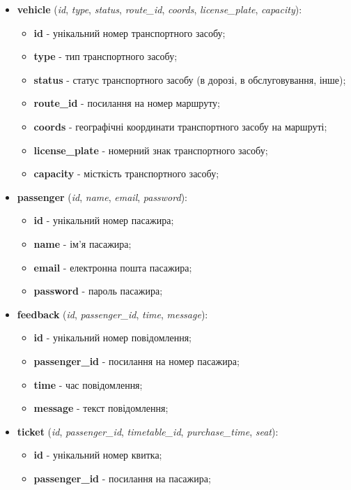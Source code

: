 \documentclass[14pt]{extreport}
\begin{document}
\begin{normalsize}
\begin{itemize}
		\item \textbf{vehicle} (\textit{id}, \textit{type}, \textit{status}, \textit{route\_id}, \textit{coords}, \textit{license\_plate}, \textit{capacity}):
		\begin{itemize}
			\item \textbf{id} - унікальний номер транспортного засобу;
			\item \textbf{type} - тип транспортного засобу; 
			\item \textbf{status} - статус транспортного засобу (в дорозі, в обслуговування, інше);
			\item \textbf{route\_id} - посилання на номер маршруту;
			\item \textbf{coords} - географічні координати транспортного засобу на маршруті;
			\item \textbf{license\_plate} - номерний знак транспортного засобу;
			\item \textbf{capacity} - місткість транспортного засобу;
		\end{itemize}
		\item \textbf{passenger} (\textit{id}, \textit{name}, \textit{email}, \textit{password}):
		\begin{itemize}
			\item \textbf{id} - унікальний номер пасажира;
			\item \textbf{name} - ім'я пасажира;
			\item \textbf{email} - електронна пошта пасажира;
			\item \textbf{password} - пароль пасажира;
		\end{itemize}
		\item \textbf{feedback} (\textit{id}, \textit{passenger\_id}, \textit{time}, \textit{message}):
		\begin{itemize}
			\item \textbf{id} - унікальний номер повідомлення;
			\item \textbf{passenger\_id} - посилання на номер пасажира;
			\item \textbf{time} - час повідомлення;
			\item \textbf{message} - текст повідомлення;
		\end{itemize}
		\item \textbf{ticket} (\textit{id}, \textit{passenger\_id}, \textit{timetable\_id}, \textit{purchase\_time}, \textit{seat}):
		\begin{itemize}
			\item \textbf{id} - унікальний номер квитка;
			\item \textbf{passenger\_id} - посилання на пасажира;

\end{itemize}
\end{itemize}
\end{normalsize}
\end{document}
